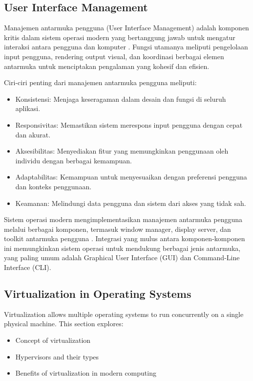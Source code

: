 \documentclass[12pt]{article}
\begin{document}
\subsection{User Interface Management}
		
		Manajemen antarmuka pengguna (User Interface Management) adalah komponen kritis dalam sistem operasi modern yang bertanggung jawab untuk mengatur interaksi antara pengguna dan komputer \cite{Lazar2017}. Fungsi utamanya meliputi pengelolaan input pengguna, rendering output visual, dan koordinasi berbagai elemen antarmuka untuk menciptakan pengalaman yang kohesif dan efisien.
		
		Ciri-ciri penting dari manajemen antarmuka pengguna meliputi:
		\begin{itemize}
			\item Konsistensi: Menjaga keseragaman dalam desain dan fungsi di seluruh aplikasi.
			\item Responsivitas: Memastikan sistem merespons input pengguna dengan cepat dan akurat.
			\item Aksesibilitas: Menyediakan fitur yang memungkinkan penggunaan oleh individu dengan berbagai kemampuan.
			\item Adaptabilitas: Kemampuan untuk menyesuaikan dengan preferensi pengguna dan konteks penggunaan.
			\item Keamanan: Melindungi data pengguna dan sistem dari akses yang tidak sah.
		\end{itemize}
		
		Sistem operasi modern mengimplementasikan manajemen antarmuka pengguna melalui berbagai komponen, termasuk window manager, display server, dan toolkit antarmuka pengguna \cite{Tanenbaum2015}. Integrasi yang mulus antara komponen-komponen ini memungkinkan sistem operasi untuk mendukung berbagai jenis antarmuka, yang paling umum adalah Graphical User Interface (GUI) dan Command-Line Interface (CLI). 


\subsection{Virtualization in Operating Systems}
Virtualization allows multiple operating systems to run concurrently on a single physical machine. This section explores:
\begin{itemize}
    \item Concept of virtualization
    \item Hypervisors and their types
    \item Benefits of virtualization in modern computing
\end{itemize}
\end{document}
